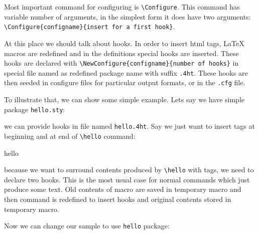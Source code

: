 Most important command for configuring is
\texttt{\textbackslash{}Configure}. This command has variable number of
arguments, in the simplest form it does have two arguments:
\texttt{\textbackslash{}Configure\{configname\}\{insert\ for\ a\ first\ hook\}}.

At this place we should talk about hooks. In order to insert html tags,
LaTeX macros are redefined and in the definitions special hooks are
inserted. These hooks are declared with
\texttt{\textbackslash{}NewConfigure\{configname\}\{number\ of\ hooks\}}
in special file named as redefined package name with suffix
\texttt{.4ht}. These hooks are then seeded in configure files for
particular output formats, or in the \texttt{.cfg} file.

To illustrate that, we can show some simple example. Lets say we have
simple package \texttt{hello.sty}:


we can provide hooks in file named \texttt{hello.4ht}. Say we just want
to insert tags at beginning and at end of \texttt{\textbackslash{}hello}
command:

\begin{texsource}
\let\tmp:hello\hello
\renewcommand\hello{\a:hello\tmp:hello\b:hello} 
\end{texsource}

because we want to surround contents produced by
\texttt{\textbackslash{}hello} with tags, we need to declare two hooks.
This is the most usual case for normal commands which just produce some
text. Old contents of macro are saved in temporary macro and then
command is redefined to insert hooks and original contents stored in
temporary macro.

Now we can change our sample to use \texttt{hello} package:


